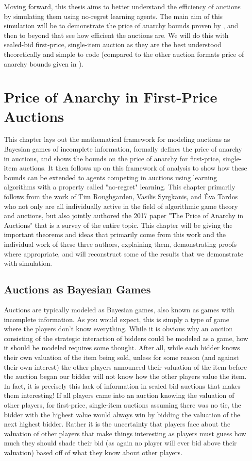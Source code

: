 \documentclass[12pt,twoside]{reedthesis}
\begin{document}
Moving forward, this thesis aims to better understand the efficiency of auctions by simulating them using no-regret learning agents. The main aim of this simulation will be to demonstrate the price of anarchy bounds proven by \cite{Roughgarden2017}, and then to beyond that see how efficient the auctions are. We will do this with sealed-bid first-price, single-item auction as they are the best understood theoretically and simple to code (compared to the other auction formats price of anarchy bounds given in \cite{Roughgarden2007}). 

\chapter{Price of Anarchy in First-Price Auctions}
This chapter lays out the mathematical framework for modeling auctions as Bayesian games of incomplete information, formally defines the price of anarchy in auctions, and shows the bounds on the price of anarchy for first-price, single-item auctions. It then follows up on this framework of analysis to show how these bounds can be extended to agents competing in auctions using learning algorithms with a property called "no-regret" learning. This chapter primarily follows from the work of Tim Roughgarden, Vasilis Syrgkanis, and \'Eva Tardos who not only are all individually active in the field of algorithmic game theory and auctions, but also jointly authored the 2017 paper "The Price of Anarchy in Auctions" that is a survey of the entire topic. This chapter will be giving the important theorems and ideas that primarily come from this work and the individual work of these three authors, explaining them, demonstrating proofs where appropriate, and will reconstruct some of the results that we demonstrate with simulation.   

\section{Auctions as Bayesian Games}
Auctions are typically modeled as Bayesian games, also known as games with incomplete information. As you would expect, this is simply a type of game where the players don't know everything. While it is obvious why an auction consisting of the strategic interaction of bidders could be modeled as a game, how it should be modeled requires some thought. After all, while each bidder knows their own valuation of the item being sold, unless for some reason (and against their own interest) the other players announced their valuation of the item before the auction began our bidder will not know how the other players value the item. In fact, it is precisely this lack of information in sealed bid auctions that makes them interesting! If all players came into an auction knowing the valuation of other players, for first-price, single-item auctions assuming there was no tie, the bidder with the highest value would always win by bidding the valuation of the next highest bidder. Rather it is the uncertainty that players face about the valuation of other players that make things interesting as players must guess how much they should shade their bid (as again no player will ever bid above their valuation) based off of what they know about other players. 
\end{document}
